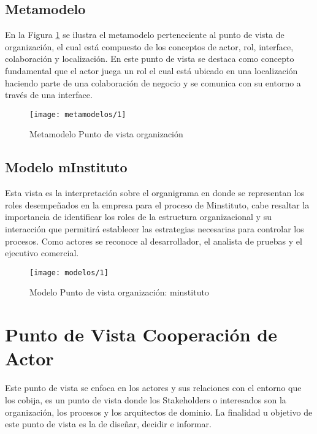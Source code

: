   \subsection{Metamodelo}
  En la Figura \ref{metamodelo1} se ilustra el metamodelo perteneciente al punto de vista de organización, el cual está compuesto de los conceptos de actor, rol, interface, colaboración y localización. En este punto de vista se destaca como concepto fundamental que el actor juega un rol el cual está ubicado en una localización haciendo parte de una colaboración de negocio y se comunica con su entorno a través de una interface. \cite{ref9}
 
 \begin{figure}[H]
   \centering
   \texttt{[image: metamodelos/1]}
   \captionsetup{width=.95\textwidth}
   \caption{Metamodelo Punto de vista organización \cite{ref9}}
   \label{metamodelo1}
 \end{figure}

 \subsection{Modelo mInstituto}
 Esta vista es la interpretación sobre el organigrama en donde se representan los roles desempeñados en la empresa para el proceso de Minstituto, cabe resaltar la importancia de identificar los roles de la estructura organizacional y su interacción que permitirá establecer las estrategias necesarias para controlar los procesos.  Como actores se reconoce al desarrollador, el analista de pruebas y el ejecutivo comercial.
  \begin{figure}[H]
   \centering
   \texttt{[image: modelos/1]}
   \captionsetup{width=.95\textwidth}
   \caption{Modelo Punto de vista organización: minstituto}
   \label{modelo1}
  \end{figure}
  
  \section{Punto de Vista Cooperación de Actor}
  Este punto de vista se enfoca en los actores y sus relaciones con el entorno que los cobija, es un punto de vista donde los Stakeholders o interesados son la organización, los procesos y los arquitectos de dominio. La finalidad u objetivo de este punto de vista es la de diseñar, decidir e informar. \cite{ref9}
  

